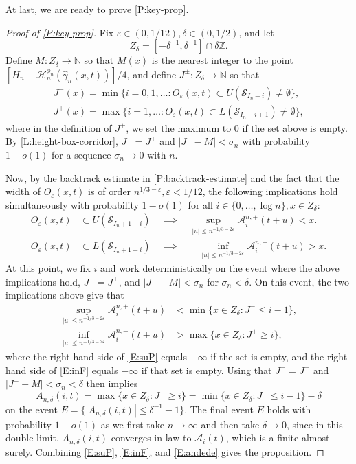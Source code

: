 \documentclass[11pt,twoside]{amsart}
\theoremstyle{plain}
\numberwithin{quest}{section}
\theoremstyle{remark}
\numberwithin{rem}{section}
\theoremstyle{definition}
\newcommand{\eps}{\varepsilon}
\newcommand{\Z}{\mathbb{Z}}
\newcommand{\N}{\mathbb{N}}
\newcommand{\cA}{\mathcal{A}}
\newcommand{\cS}{\mathcal{S}}
\newcommand{\cH}{\mathcal{H}}
\begin{document}
At last, we are ready to prove \cref{P:key-prop}.

\begin{proof}[Proof of \cref{P:key-prop}]
Fix $\eps \in (0, 1/12), \delta \in (0, 1/2)$, and let 
$$
Z_\delta = [-\delta^{-1}, \delta^{-1}] \cap \delta \Z.
$$
Define $M:Z_\delta \to \N$ so that $M(x)$ is the nearest integer to the point $[H_n - \cH_n^{\phi_n}(\hat \gamma_n(x, t))]/4$, and define $J^\pm:Z_\delta \to \N$ so that 
\begin{align*}
J^-(x) = \min \{i = 0, 1, \dots: O_\eps(x, t) \subset U(\cS_{I_n - i}) \ne \emptyset\}, \\
J^+(x) = \max \{i = 1, \dots: O_\eps(x, t) \subset L(\cS_{I_n - i + 1}) \ne \emptyset\},
\end{align*}
where in the definition of $J^+$, we set the maximum to $0$ if the set above is empty.
By \cref{L:height-box-corridor}, $J^- = J^+$ and $|J^- - M| < \sigma_n$ with probability $1 - o(1)$ for a sequence $\sigma_n \to 0$ with $n$. 

Now, by the backtrack estimate in \cref{P:backtrack-estimate} and the fact that the width of $O_\eps(x, t)$ is of order $n^{1/3 - \eps}, \eps < 1/12$, the following implications hold simultaneously with probability $1 - o(1)$ for all $i \in \{0, \dots, \log n\}, x \in Z_\delta$:
\begin{align*}
O_\eps(x, t) &\subset U(\cS_{I_n + 1 - i}) \quad \implies \quad \sup_{|u| \le n^{-1/3-2\eps}} \cA_i^{n, +}(t + u) < x.  \\
O_\eps(x, t) &\subset L(\cS_{I_n + 1 - i}) \quad \implies \qquad \inf_{|u| \le n^{-1/3-2\eps}} \cA_i^{n, -}(t + u) > x.
\end{align*}
At this point, we fix $i$ and work deterministically on the event where the above implications hold, $J^- = J^+$, and $|J^- - M| < \sigma_n$ for $\sigma_n < \delta$. On this event, the two implications above give that
\begin{align}
	\label{E:suP}
\sup_{|u| \le n^{-1/3-2\eps}} \cA_i^{n, +}(t + u) &< \min \{x \in Z_\delta : J^- \le i -1 \}, \\
\label{E:inF}
\inf_{|u| \le n^{-1/3-2\eps}} \cA_i^{n, -}(t + u) &> \max \{x \in Z_\delta : J^+ \ge i \},
\end{align}
where the right-hand side of \eqref{E:suP} equals $-\infty$ if the set is empty, and the right-hand side of \eqref{E:inF} equals $-\infty$ if that set is empty. Using that $J^- = J^+$ and $|J^- - M| < \sigma_n < \delta$ then implies
	\begin{equation}
		\label{E:andede}
A_{n, \delta}(i, t) = \max \{x \in Z_\delta : J^+ \ge i \} = \min \{x \in Z_\delta : J^- \le i -1 \} - \delta
	\end{equation}
on the event $E = \{|A_{n, \delta}(i, t)| \le \delta^{-1} - 1\}$. The final event $E$ holds with probability $1 - o(1)$ as we first take $n \to \infty$ and then take $\delta \to 0$, since in this double limit, $A_{n, \delta}(i, t)$ converges in law to $\cA_i(t)$, which is a finite almost surely. Combining \eqref{E:suP}, \eqref{E:inF}, and \eqref{E:andede} gives the proposition.
\end{proof}
	
\end{document}
